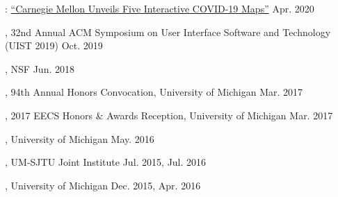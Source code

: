
\begin{cvhonors}
  \cvhonor
    {: \href{https://www.cmu.edu/news/stories/archives/2020/april/cmu-unveils-covidcast-maps.html}{``Carnegie Mellon Unveils Five Interactive COVID-19 Maps''}} %
    {Apr. 2020} %
  \end{cvhonors}

\begin{cvhonors}
  \cvhonor
    {, 32nd Annual ACM Symposium on User Interface Software and Technology (UIST 2019)} %
    {Oct. 2019} %
  \end{cvhonors}

\begin{cvhonors}
  \cvhonor
    {, NSF} %
    {Jun. 2018} %
\end{cvhonors}

\begin{cvhonors}
  \cvhonor
    {, 94th Annual Honors Convocation, University of Michigan} %
    {Mar. 2017} %
  \end{cvhonors}

\begin{cvhonors}
  \cvhonor
    {, 2017 EECS Honors \& Awards Reception, University of Michigan} %
    {Mar. 2017} %
  \end{cvhonors}

\begin{cvhonors}
  \cvhonor
    {, University of Michigan} %
    {May. 2016} %
  \end{cvhonors}

\begin{cvhonors}
  \cvhonor
    {, UM-SJTU Joint Institute} %
    {Jul. 2015, Jul. 2016} %
  \end{cvhonors}

\begin{cvhonors}    
  \cvhonor
    {, University of Michigan} %
    {Dec. 2015, Apr. 2016} %
  \end{cvhonors}

